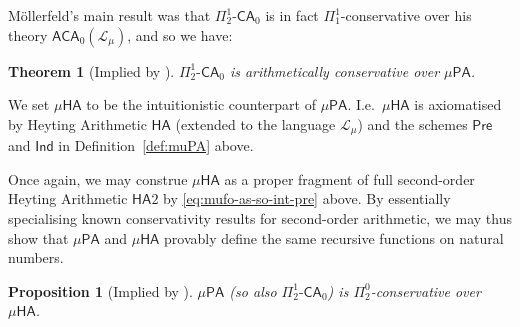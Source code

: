 \documentclass[10pt,a4paper]{amsart}
\theoremstyle{plain}
\newtheorem{theorem}[theorem]{Theorem}
\newtheorem{proposition}[proposition]{Proposition}
\theoremstyle{definition}
\newtheorem{remark}[remark]{Remark}
\newcommand{\anupam}[1]{\todo[color=green]{A: #1}}
\renewcommand{\todo}[1]{}
\renewcommand{\anupam}[1]{}
\theoremstyle{plain}
\theoremstyle{definition} %
\newcommand{\Lang}{\mathcal L}
\newcommand{\lang}[1]{\Lang_{#1}}
\newcommand{\langmuarith}{\lang \mu}
\newcommand{\Pin}[2]{\Pi^{#1}_{#2}}
\newcommand{\PA}{\mathsf{PA}}
\newcommand{\HA}{\mathsf{HA}}
\newcommand{\muPA}{\mu\PA}
\newcommand{\muHA}{\mu\HA}
\newcommand{\SOHA}{\HA2}
\newcommand{\preaxiom}{\mathsf{Pre}}
\newcommand{\indaxiom}{\mathsf{Ind}}
\newcommand{\CA}{\mathsf{CA}}
\newcommand{\ca}[1]{#1\text{-}\CA}
\newcommand{\PSCA}{\ca{\Pin 1 2 }_0}
\newcommand{\ACA}{\mathsf{ACA}_0}
\begin{document}
M\"ollerfeld's main result was that $\PSCA$ is in fact $\Pin 1 1 $-conservative over his theory $\ACA(\langmuarith)$, and so we have:

\begin{theorem}
    [Implied by \cite{Moellerfeld02:phd-thesis}]
    \label{thm:moellerfeld-psca-cons-over-muPA}
    $\PSCA$ is arithmetically conservative over $\muPA$.
\end{theorem}



\anupam{commented fo-parts below}


We set $\muHA$ to be the intuitionistic counterpart of $\muPA$.
I.e.\ $\muHA$ is axiomatised by Heyting Arithmetic $\HA$ (extended to the language $\langmuarith$) and the schemes $\preaxiom$ and $\indaxiom$ in Definition~\ref{def:muPA} above.


Once again, we may construe $\muHA$ as a proper fragment of full second-order Heyting Arithmetic $\SOHA$ by \eqref{eq:mufo-as-so-int-pre} above.
By essentially specialising known conservativity results for second-order arithmetic, we may thus show that $\muPA$ and $\muHA$ provably define the same recursive functions on natural numbers.
\begin{proposition}
[Implied by \cite{Tupailo04doubleneg}]
\label{thm:muPA-pi02-cons-muHA}
    $\muPA$ (so also $\PSCA$) is $\Pin 0 2$-conservative over $\muHA$.
\end{proposition}
\end{document}
